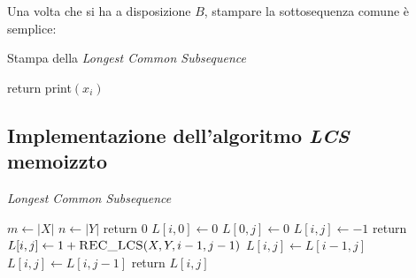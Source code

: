Una volta che si ha a disposizione $B$, stampare la sottosequenza comune è semplice:
\begin{algorithm}[H]
\caption{Stampa della \emph{Longest Common Subsequence}}\label{alg:lcsprint}
\begin{algorithmic}[1]
            \State return
        \EndIf
            \State {}
            \State print$\left( x_i \right)$ 
        \Else
                \State {}
            \Else
                \State {}
            \EndIf
        \EndIf
    \EndProcedure
\end{algorithmic}
\end{algorithm}

\subsection{Implementazione dell'algoritmo \emph{LCS} memoizzto}
\begin{algorithm}[H]
\caption{\emph{Longest Common Subsequence}}\label{alg:lcsmem}
\begin{algorithmic}[1]
        \State $m \gets |X|$
        \State $n \gets |Y|$
            \State return $0$
        \EndIf
            \State $L[i,0] \gets 0$
        \EndFor
            \State $L[0,j] \gets 0$
        \EndFor
                \State $L[i,j] \gets -1$
            \EndFor
        \EndFor
        \State return 
    \EndProcedure
                \State $L[i,j] \gets 1 + \Call{REC\_LCS}{X,Y,i-1,j-1}$
            \Else
                \label{alg:lcsmem:c1}
                    \State $L[i,j] \gets L[i-1,j]$
                \Else
                    \State $L[i,j] \gets L[i,j-1]$
                \EndIf
            \EndIf
        \EndIf
        \State return $L[i,j]$
    \EndProcedure
\end{algorithmic}
\end{algorithm}

